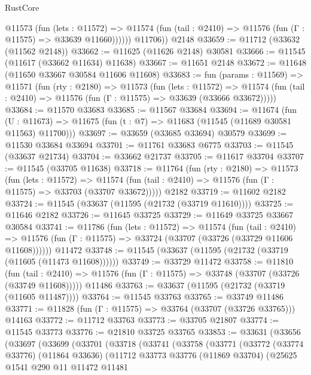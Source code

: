 \begin{lexlean}{RustCore}
\begin{coremodule}
            @11573
              (fun (lets : @11572) =>
              @11574 (fun (tail : @2410) => @11576 (fun (Γ : @11575) => @33639 @11660))))))
        @11706))
    @2148
@33659 := @11712 (@33632 (@11562 @2148))
@33662 := @11625 (@11626 @2148) @30581
@33666 := @11545 (@11617 (@33662 @11634) @11638)
@33667 := @11651 @2148
@33672 := @11648 (@11650 @33667 @30584 @11606 @11608)
@33683 := fun (params : @11569) =>
  @11571
    (fun (rty : @2180) =>
    @11573
      (fun (lets : @11572) =>
      @11574 (fun (tail : @2410) => @11576 (fun (Γ : @11575) => @33639 (@33666 @33672)))))
@33684 := @11570 @33683
@33685 := @11567 @33684
@33694 := @11674
    (fun (U : @11673) => @11675 (fun (t : @7) => @11683 (@11545 (@11689 @30581 @11563) @11700)))
@33697 := @33659 (@33685 @33694) @30579
@33699 := @11530 @33684 @33694
@33701 := @11761 @33683 @6775
@33703 := @11545 (@33637 @21734)
@33704 := @33662 @21737
@33705 := @11617 @33704
@33707 := @11545 (@33705 @11638)
@33718 := @11764
    (fun (rty : @2180) =>
    @11573
      (fun (lets : @11572) =>
      @11574 (fun (tail : @2410) => @11576 (fun (Γ : @11575) => @33703 (@33707 @33672)))))
    @2182
@33719 := @11602 @2182
@33724 := @11545 (@33637 (@11595 (@21732 (@33719 @11610))))
@33725 := @11646 @2182
@33726 := @11645 @33725
@33729 := @11649 @33725 @33667 @30584
@33741 := @11786
    (fun (lets : @11572) =>
    @11574
      (fun (tail : @2410) =>
      @11576 (fun (Γ : @11575) => @33724 (@33707 (@33726 (@33729 @11606 @11608))))))
    @11472
@33748 := @11545 (@33637 (@11595 (@21732 (@33719 (@11605 (@11473 @11608))))))
@33749 := @33729 @11472
@33758 := @11810
    (fun (tail : @2410) => @11576 (fun (Γ : @11575) => @33748 (@33707 (@33726 (@33749 @11608)))))
    @11486
@33763 := @33637 (@11595 (@21732 (@33719 (@11605 @11487))))
@33764 := @11545 @33763
@33765 := @33749 @11486
@33771 := @11828 (fun (Γ : @11575) => @33764 (@33707 (@33726 @33765))) @14163
@33772 := @11712 @33763
@33773 := @33705 @21807
@33774 := @11545 @33773
@33776 := @21810 @33725 @33765
@33853 := @33631
    (@33656
      (@33697
        (@33699
          (@33701
            (@33718
              (@33741
                (@33758
                  (@33771
                    (@33772
                      (@33774 @33776)
                      (@11864 @33636)
                      (@11712
                        @33773
                        @33776
                        (@11869 @33704)
                        (@25625
                          @1541
                          @290
                          @11
                          @11472
                          @11481

\end{coremodule}
\end{lexlean}
